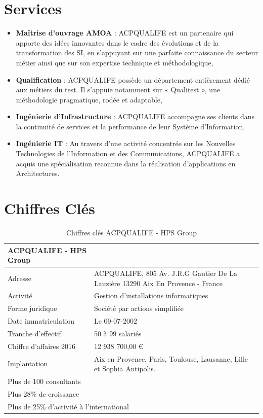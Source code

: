 \section{Services}

\begin{itemize}[leftmargin=*]
\item \textbf{Maîtrise d'ouvrage AMOA} : ACPQUALIFE est un partenaire qui apporte des idées innovantes dans le cadre des évolutions et de la transformation des SI, en s'appuyant sur une parfaite connaissance du secteur métier ainsi que sur son expertise technique et méthodologique,
\item \textbf{Qualification} : ACPQUALIFE possède un département entièrement dédié aux métiers du test. Il s'appuie notamment sur « Qualitest », une méthodologie pragmatique, rodée et adaptable,
\item \textbf{Ingénierie d'Infrastructure} : ACPQUALIFE accompagne ses clients dans la continuité de services et la performance de leur Système d'Information,
\item \textbf{Ingénierie IT} : Au travers d'une activité concentrée sur les Nouvelles Technologies de l'Information et des Communications, ACPQUALIFE a acquis une spécialisation reconnue dans la réalisation d'applications en Architectures.
\end{itemize}

\section{Chiffres Clés}

\begin{table}[H]
\centering
\caption{Chiffres clés ACPQUALIFE - HPS Group}
\begin{tabularx}{0.9\textwidth}{l X}
\toprule
\textbf{ACPQUALIFE - HPS Group} & \\
\midrule
Adresse & ACPQUALIFE, 805 Av. J.R.G Gautier De La Lauzière 13290 Aix En Provence - France \\
Activité & Gestion d'installations informatiques \\
Forme juridique & Société par actions simplifiée \\
Date immatriculation & Le 09-07-2002 \\
Tranche d'effectif & 50 à 99 salariés \\
Chiffre d'affaires 2016 & 12 938 700,00 \euro \\
Implantation & Aix en Provence, Paris, Toulouse, Lausanne, Lille et Sophia Antipolis. \\
\midrule
\multicolumn{2}{l}{Plus de 100 consultants} \\
\multicolumn{2}{l}{Plus 28\% de croissance} \\
\multicolumn{2}{l}{Plus de 25\% d'activité à l'international} \\
\bottomrule
\end{tabularx}
\end{table}

